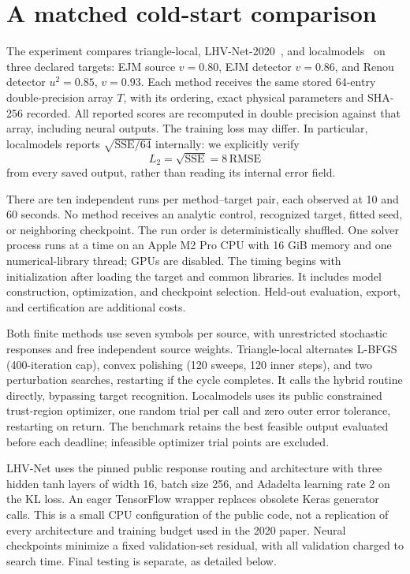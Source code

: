 \documentclass[10pt]{article}
\begin{document}
\newpage
\section{A matched cold-start comparison}
The experiment compares triangle-local, LHV-Net-2020~\cite{krivachy}, and
localmodels~\cite{dasilva} on three declared targets: EJM source $v=0.80$,
EJM detector $v=0.86$, and Renou detector $u^2=0.85$, $v=0.93$.
Each method receives the same stored 64-entry double-precision array $T$, with
its ordering, exact physical parameters and SHA-256 recorded. All reported
scores are recomputed in double precision against that array, including neural
outputs. The training loss may differ. In particular, localmodels reports
$\sqrt{\mathrm{SSE}/64}$ internally: we explicitly verify
\begin{equation}
 L_2=\sqrt{\mathrm{SSE}}=8\,\mathrm{RMSE}
\end{equation}
from every saved output, rather than reading its internal error field.

There are ten independent runs per method--target pair, each observed at
10 and 60 seconds. No method receives an analytic control, recognized target,
fitted seed, or neighboring checkpoint. The run order is deterministically
shuffled. One solver process runs at a time on an Apple M2 Pro CPU with
16 GiB memory and one numerical-library thread; GPUs are disabled.
The timing begins with initialization after loading the target and common
libraries. It includes model construction, optimization, and checkpoint
selection. Held-out evaluation, export, and certification are additional costs.

Both finite methods use seven symbols per source, with unrestricted stochastic
responses and free independent source weights. Triangle-local alternates
L-BFGS (400-iteration cap), convex polishing (120 sweeps, 120 inner steps), and
two perturbation searches, restarting if the cycle completes. It calls the
hybrid routine directly, bypassing target recognition. Localmodels uses its
public constrained trust-region optimizer, one random trial per call and zero
outer error tolerance, restarting on return. The benchmark retains the best
feasible output evaluated before each deadline; infeasible optimizer trial
points are excluded.

LHV-Net uses the pinned public response routing and architecture with three
hidden tanh layers of width 16, batch size 256, and Adadelta learning rate 2
on the KL loss. An eager TensorFlow wrapper replaces obsolete Keras generator
calls. This is a small CPU configuration of the public code, not a replication
of every architecture and training budget used in the 2020 paper. Neural
checkpoints minimize a fixed validation-set residual, with all validation
charged to search time. Final testing is separate, as detailed below.
\end{document}
